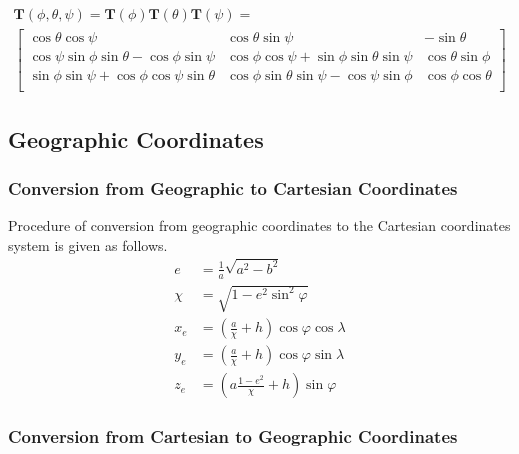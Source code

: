 \begin{equation}
  \begin{array}{c}
  \boldsymbol T \left( \phi,\theta,\psi \right) =
  \boldsymbol T \left( \phi \right)
  \boldsymbol T \left( \theta \right) 
  \boldsymbol T \left( \psi \right) = \\
  \left[
    \begin{matrix}
       \cos \theta \cos \psi &
       \cos \theta \sin \psi &
      -\sin \theta \\
       \cos \psi   \sin \phi   \sin \theta - \cos \phi   \sin \psi &
       \cos \phi   \cos \psi + \sin \phi     \sin \theta \sin \psi &
       \cos \theta \sin \phi \\
       \sin \phi   \sin \psi + \cos \phi     \cos \psi   \sin \theta &
       \cos \phi   \sin \theta \sin \psi   - \cos \psi   \sin \phi &
       \cos \phi   \cos \theta \\
    \end{matrix}
  \right]
  \end{array}
\end{equation}

\subsection{Geographic Coordinates}

\subsubsection{Conversion from Geographic to Cartesian Coordinates}

Procedure of conversion from geographic coordinates to the Cartesian coordinates system is given as follows.
\begin{align}
  e    &= \frac{1}{a} \sqrt{a^2-b^2} \\
  \chi &= \sqrt{ 1 - e^2 \sin^2 \varphi } \\
  x_e  &= \left( \frac{a}{\chi} + h \right) \cos \varphi \cos \lambda \\
  y_e  &= \left( \frac{a}{\chi} + h \right) \cos \varphi \sin \lambda \\
  z_e  &= \left( a \frac{1-e^2}{\chi} + h \right) \sin \varphi
\end{align}

\subsubsection{Conversion from Cartesian to Geographic Coordinates}

